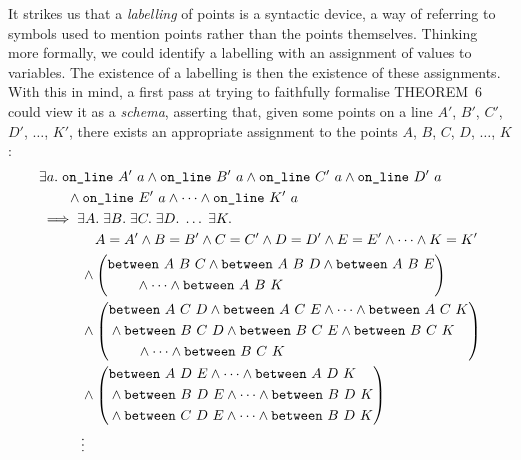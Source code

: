 It strikes us that a \emph{labelling} of points is a syntactic device, a way of referring to symbols used to mention points rather than the points themselves. Thinking more formally, we could identify a labelling with an assignment of values to variables. The existence of a labelling is then the existence of these assignments. With this in mind, a first pass at trying to faithfully formalise THEOREM~6 could view it as a \emph{schema}, asserting that, given some points on a line $A'$, $B'$, $C'$, $D'$, $\ldots$, $K'$, there exists an appropriate assignment to the points $A$, $B$, $C$, $D$, $\ldots$, $K$:
\begin{equation*}
  \begin{split}
    &\exists a.\;\code{on\_line}\ A'\ a\wedge\code{on\_line}\ B'\ a\wedge\code{on\_line}\ C'\ a\wedge\code{on\_line}\ D'\ a\\
    &\qquad\wedge\code{on\_line}\ E'\ a\wedge\cdots\wedge\code{on\_line}\ K'\ a\\
    &\implies\exists A.\;\exists B.\;\exists C.\;\exists D.\; \ldots\;\exists K.\; \\
    &\qquad\qquad A = A' \wedge B = B' \wedge C = C' \wedge D = D' \wedge E = E' \wedge \cdots \wedge K = K'\\
    &\qquad\quad\wedge\left(\begin{split}&\between{A}{B}{C} \wedge \between{A}{B}{D} \wedge \between{A}{B}{E} \\ &\qquad\wedge\cdots \wedge \between{A}{B}{K}\end{split}\right) \\
    &\qquad\quad\wedge
    \left(\begin{split}&\between{A}{C}{D} \wedge \between{A}{C}{E} \wedge \cdots \wedge \between{A}{C}{K}\\
        &\wedge\between{B}{C}{D} \wedge \between{B}{C}{E} \wedge \between{B}{C}{K}\\
        &\qquad\wedge \cdots \wedge \between{B}{C}{K}
      \end{split}\right)\\  
    &\qquad\quad\wedge
    \left(\begin{split}&\between{A}{D}{E} \wedge \cdots \wedge \between{A}{D}{K} \\
        &\wedge\between{B}{D}{E} \wedge \cdots \wedge \between{B}{D}{K} \\
        &\wedge\between{C}{D}{E} \wedge \cdots \wedge \between{B}{D}{K}
        \end{split}\right)\\
    &\qquad\quad\vdots
  \end{split}
\end{equation*}

